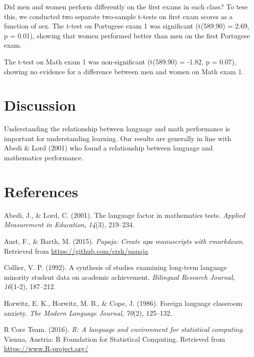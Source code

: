 \documentclass[english,floatsintext,man]{apa6}
\begin{document}
Did men and women perform differently on the first exams in each class?
To tese this, we conducted two separate two-sample t-tests on first exam
scores as a function of sex. The t-test on Portugese exam 1 was
significant (t(589.90) = 2.69, p = 0.01), showing that women performed
better than men on the first Portugese exam.

The t-test on Math exam 1 was non-significant (t(589.90) = -1.82, p =
0.07), showing no evidence for a difference between men and women on
Math exam 1.

\section{Discussion}\label{discussion}

Understanding the relationship between language and math performance is
important for understanding learning. Our results are generally in line
with Abedi \& Lord (2001) who found a relationship between language and
mathematics performance.

\section{References}\label{references}

\setlength{\parindent}{-0.5in} \setlength{\leftskip}{0.5in}
\setlength{\parskip}{8pt}

\hypertarget{refs}{}
\hypertarget{ref-abedi2001language}{}
Abedi, J., \& Lord, C. (2001). The language factor in mathematics tests.
\emph{Applied Measurement in Education}, \emph{14}(3), 219--234.

\hypertarget{ref-aust2015papaja}{}
Aust, F., \& Barth, M. (2015). \emph{Papaja: Create apa manuscripts with
rmarkdown}. Retrieved from \url{https://github.com/crsh/papaja}

\hypertarget{ref-collier1992synthesis}{}
Collier, V. P. (1992). A synthesis of studies examining long-term
language minority student data on academic achievement. \emph{Bilingual
Research Journal}, \emph{16}(1-2), 187--212.

\hypertarget{ref-horwitz1986foreign}{}
Horwitz, E. K., Horwitz, M. B., \& Cope, J. (1986). Foreign language
classroom anxiety. \emph{The Modern Language Journal}, \emph{70}(2),
125--132.

\hypertarget{ref-R}{}
R Core Team. (2016). \emph{R: A language and environment for statistical
computing}. Vienna, Austria: R Foundation for Statistical Computing.
Retrieved from \url{https://www.R-project.org/}
\end{document}
